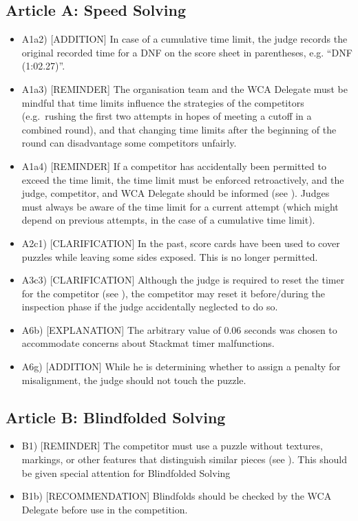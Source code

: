 \subsection{ Article A: Speed Solving}

\begin{itemize}
\item
  A1a2) {[}ADDITION{]} In case of a cumulative time limit, the judge
  records the original recorded time for a DNF on the score sheet in
  parentheses, e.g. ``DNF (1:02.27)''.
\item
  A1a3) {[}REMINDER{]} The organisation team and the WCA Delegate must
  be mindful that time limits influence the strategies of the
  competitors (e.g.~rushing the first two attempts in hopes of meeting a
  cutoff in a combined round), and that changing time limits after the
  beginning of the round can disadvantage some competitors unfairly.
\item
  A1a4) {[}REMINDER{]} If a competitor has accidentally been permitted
  to exceed the time limit, the time limit must be enforced
  retroactively, and the judge, competitor, and WCA Delegate should be
  informed (see ). Judges must always be aware of the time limit for a
  current attempt (which might depend on previous attempts, in the case
  of a cumulative time limit).
\item
  A2c1) {[}CLARIFICATION{]} In the past, score cards have been used to
  cover puzzles while leaving some sides exposed. This is no longer
  permitted.
\item
  A3c3) {[}CLARIFICATION{]} Although the judge is required to reset the
  timer for the competitor (see ), the competitor may reset it
  before/during the inspection phase if the judge accidentally neglected
  to do so.
\item
  A6b) {[}EXPLANATION{]} The arbitrary value of 0.06 seconds was chosen
  to accommodate concerns about Stackmat timer malfunctions.
\item
  A6g) {[}ADDITION{]} While he is determining whether to assign a
  penalty for misalignment, the judge should not touch the puzzle.
\end{itemize}

\subsection{ Article B: Blindfolded Solving}

\begin{itemize}
\item
  B1) {[}REMINDER{]} The competitor must use a puzzle without textures,
  markings, or other features that distinguish similar pieces (see ).
  This should be given special attention for Blindfolded Solving
\item
  B1b) {[}RECOMMENDATION{]} Blindfolds should be checked by the WCA
  Delegate before use in the competition.
\end{itemize}

